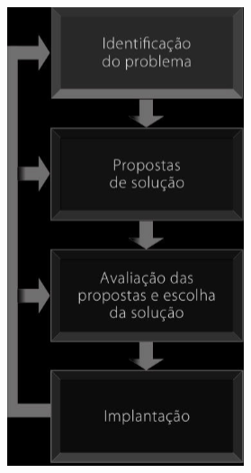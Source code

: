 \documentclass[
]{book}
\begin{document}
\includegraphics{images/clipboard-3657052893.png}
\end{document}
